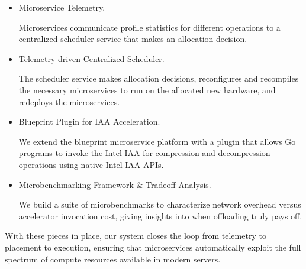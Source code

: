 \begin{itemize}
    \item Microservice Telemetry.

    Microservices communicate profile statistics for different operations to a centralized scheduler service that makes an allocation decision.

    \item Telemetry-driven Centralized Scheduler.

    The scheduler service makes allocation decisions, reconfigures and recompiles the necessary microservices to run on the allocated new hardware, and redeploys the microservices.

    \item Blueprint Plugin for IAA Acceleration.

    We extend the blueprint microservice platform with a plugin that allows Go programs to invoke the Intel IAA for compression and decompression operations using native Intel IAA APIs.

    \item Microbenchmarking Framework \& Tradeoff Analysis.

    We build a suite of microbenchmarks to characterize network overhead versus accelerator invocation cost, giving insights into when offloading truly pays off.
\end{itemize}

With these pieces in place, our system closes the loop from telemetry to placement to execution, ensuring that microservices automatically exploit the full spectrum of compute resources available in modern servers.

